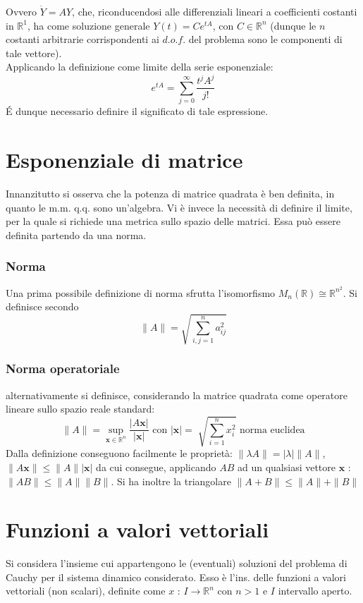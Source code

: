 \documentclass[10pt, oneside]{book}
\theoremstyle{plain}
\begin{document}
Ovvero $\dot{Y} = A Y$, che, riconducendosi alle differenziali lineari a coefficienti costanti in $\mathbb{R}^1$, ha come soluzione generale $\displaystyle Y(t) = C e^{t A}$, con $C \in \mathbb{R}^n$ (dunque le $n$ costanti arbitrarie corrispondenti ai $d.o.f.$ del problema sono le componenti di tale vettore).
\\Applicando la definizione come limite della serie esponenziale:
\[e^{t A} = \sum \limits_{j = 0}^\infty \frac{t^j A^j}{j!}\]
\'E dunque necessario definire il significato di tale espressione.

\section{Esponenziale di matrice}
Innanzitutto si osserva che la potenza di matrice quadrata è ben definita, in quanto le m.m. q.q. sono un'algebra. Vi è invece la necessità di definire il limite, per la quale si richiede una metrica sullo spazio delle matrici. Essa può essere definita partendo da una norma.
\subsubsection{Norma}
Una prima possibile definizione di norma sfrutta l'isomorfismo $M_n(\mathbb{R}) \cong \mathbb{R}^{n^2}$. Si definisce secondo 
\[\|A\| = \sqrt{\sum \limits_{i,j = 1}^n a_{ij}^2}\]

\subsubsection{Norma operatoriale} alternativamente si definisce, considerando la matrice quadrata come operatore lineare sullo spazio reale standard:
\[\|A\| = \sup\limits_{\displaystyle \mathbf{x} \in \mathbb{R}^n} \frac{|A\mathbf{x}|}{|\mathbf{x}|} \textrm{ con } |\mathbf{x}| = \sqrt[]{\sum\limits_{i=1}^n x_i^2} \textrm{ norma euclidea}\]
Dalla definizione conseguono facilmente le proprietà: $\displaystyle \|\lambda A\| = |\lambda| \|A\|$, $\displaystyle \|A \mathbf{x}\| \leq \|A\| |\mathbf{x}|$ da cui consegue, applicando $AB$ ad un qualsiasi vettore $\mathbf{x}$ : $\displaystyle \|AB\| \leq \|A\| \|B\|$. Si ha inoltre la triangolare $\displaystyle \|A + B\| \leq \|A\| + \|B\|$

\section{Funzioni a valori vettoriali}
Si considera l'insieme cui appartengono le (eventuali) soluzioni del problema di Cauchy per il sistema dinamico considerato. Esso è l'ins. delle funzioni a valori vettoriali (non scalari), definite come $\displaystyle x$ : $I \rightarrow \mathbb{R}^n$ con $n > 1$ e $I$ intervallo aperto.
\end{document}
